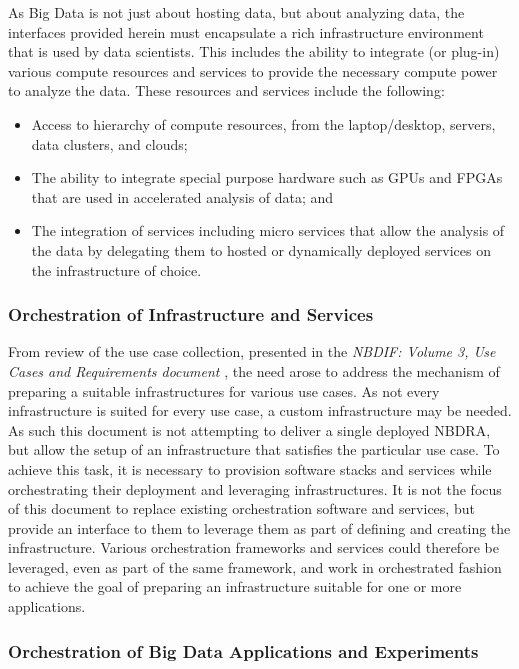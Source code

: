 \documentclass[10pt]{article}
\begin{document}
As Big Data is not just about hosting data, but about analyzing data,
the interfaces provided herein must encapsulate a rich infrastructure
environment that is used by data scientists. This includes the ability
to integrate (or plug-in) various compute resources and services to
provide the necessary compute power to analyze the data. These resources and services 
include the following: 
\begin{itemize}
\item Access to hierarchy of compute resources, from the laptop/desktop,
servers, data clusters, and clouds; 
\item The ability to integrate
special purpose hardware such as GPUs and FPGAs that are used in
accelerated analysis of data; and 
\item The integration of services
including micro services that allow the analysis of the data by
delegating them to hosted or dynamically deployed services on the
infrastructure of choice.
\end{itemize}

\subsubsection{Orchestration of Infrastructure and Services}

From review of the use case collection, presented in 
the {\it NBDIF: Volume 3, Use Cases and Requirements document}
\cite{nist-vol-3}, the need arose to address the mechanism
of preparing a suitable infrastructures for various use cases. As not
every infrastructure is suited for every use case, a custom
infrastructure may be needed. As such this document is not attempting to deliver
a single deployed NBDRA, but allow the setup of an infrastructure that
satisfies the particular use case. To achieve this task, it is necessary to
provision software stacks and services while orchestrating their
deployment and leveraging infrastructures. It is not the focus of this
document to replace existing orchestration software and services, but
provide an interface to them to leverage them as part of defining and
creating the infrastructure. Various orchestration frameworks and
services could therefore be leveraged, even as part of the same
framework, and work in orchestrated fashion to achieve the goal of
preparing an infrastructure suitable for one or more applications.

\subsubsection{Orchestration of Big Data Applications and Experiments}
\end{document}
